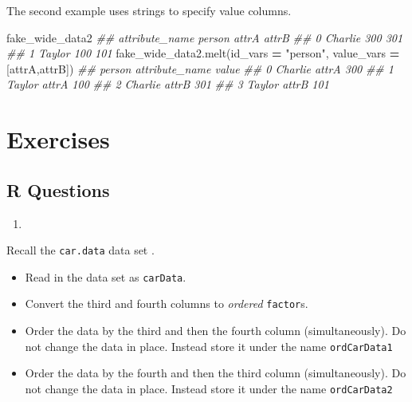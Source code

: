 \documentclass[
  12pt,
  krantz2]{krantz}
\makeatletter
\newenvironment{Shaded}{\begin{snugshade}}{\end{snugshade}}
\newcommand{\CommentTok}[1]{\textcolor[rgb]{0.37,0.37,0.37}{\textit{#1}}}
\newcommand{\NormalTok}[1]{#1}
\newcommand{\OperatorTok}[1]{\textcolor[rgb]{0.43,0.43,0.43}{\textbf{#1}}}
\newcommand{\StringTok}[1]{\textcolor[rgb]{0.5,0.5,0.5}{#1}}
\providecommand{\tightlist}{%
  \setlength{\itemsep}{0pt}\setlength{\parskip}{0pt}}
\newenvironment{kframe}{%
\medskip{}
\setlength{\fboxsep}{.8em}
 \def\at@end@of@kframe{}%
 \ifinner\ifhmode%
  \def\at@end@of@kframe{\end{minipage}}%
  \begin{minipage}{\columnwidth}%
 \fi\fi%
 \def\FrameCommand##1{\hskip\@totalleftmargin \hskip-\fboxsep
 \colorbox{shadecolor}{##1}\hskip-\fboxsep
     \hskip-\linewidth \hskip-\@totalleftmargin \hskip\columnwidth}%
 \MakeFramed {\advance\hsize-\width
   \@totalleftmargin\z@ \linewidth\hsize
   \@setminipage}}%
 {\par\unskip\endMakeFramed%
 \at@end@of@kframe}
\renewenvironment{Shaded}{\begin{kframe}}{\end{kframe}}
\makeatother
\begin{document}
The second example uses strings to specify value columns.

\begin{Shaded}
\begin{Highlighting}[]
\NormalTok{fake\_wide\_data2}
\CommentTok{\#\# attribute\_name   person  attrA  attrB}
\CommentTok{\#\# 0               Charlie    300    301}
\CommentTok{\#\# 1                Taylor    100    101}
\NormalTok{fake\_wide\_data2.melt(id\_vars }\OperatorTok{=} \StringTok{"person"}\NormalTok{, value\_vars }\OperatorTok{=}\NormalTok{ [}\StringTok{\textquotesingle{}attrA\textquotesingle{}}\NormalTok{,}\StringTok{\textquotesingle{}attrB\textquotesingle{}}\NormalTok{])}
\CommentTok{\#\#     person attribute\_name  value}
\CommentTok{\#\# 0  Charlie          attrA    300}
\CommentTok{\#\# 1   Taylor          attrA    100}
\CommentTok{\#\# 2  Charlie          attrB    301}
\CommentTok{\#\# 3   Taylor          attrB    101}
\end{Highlighting}
\end{Shaded}

\hypertarget{exercises-10}{%
\section{Exercises}\label{exercises-10}}

\hypertarget{r-questions-9}{%
\subsection{R Questions}\label{r-questions-9}}

\begin{enumerate}
\def\labelenumi{\arabic{enumi}.}
\tightlist
\item
\end{enumerate}

Recall the \texttt{car.data} data set \citep{misc_car_evaluation_19}.

\begin{itemize}
\tightlist
\item
  Read in the data set as \texttt{carData}.
\item
  Convert the third and fourth columns to \emph{ordered} \texttt{factor}s.
\item
  Order the data by the third and then the fourth column (simultaneously). Do not change the data in place. Instead store it under the name \texttt{ordCarData1}
\item
  Order the data by the fourth and then the third column (simultaneously). Do not change the data in place. Instead store it under the name \texttt{ordCarData2}
\end{itemize}
\end{document}
